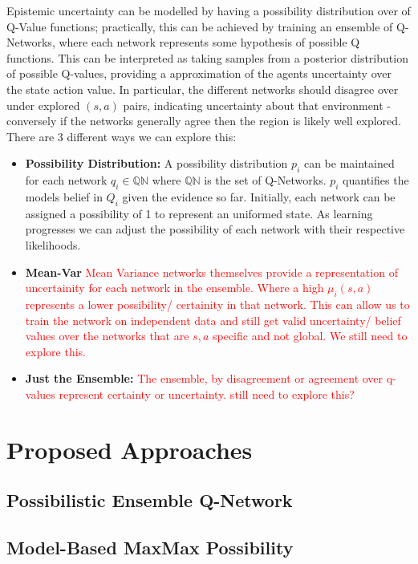 \documentclass[12pt,a4paper]{report}
\newcommand\myworries[1]{\textcolor{red}{#1}}
\begin{document}
Epistemic uncertainty can be modelled by having a possibility distribution over of Q-Value functions; practically, this can be achieved by training an ensemble of Q-Networks, where each network represents some hypothesis of possible Q functions. This can be interpreted as taking samples from a posterior distribution of possible Q-values, providing a approximation of the agents uncertainty over the state action value. In particular, the different networks should disagree over under explored $(s,a)$ pairs, indicating uncertainty about that environment - conversely if the networks generally agree then the region is likely well explored. There are 3 different ways we can explore this:
\begin{itemize}
  \item \textbf{Possibility Distribution:} A possibility distribution $p_i$ can be maintained for each network $q_i \in \mathbb{QN}$ where $\mathbb{QN}$  is the set of Q-Networks. $p_i$ quantifies the models belief in $Q_i$ given the evidence so far. Initially, each network can be assigned a possibility of 1 to represent an uniformed state. As learning progresses we can adjust the possibility of each network with their respective likelihoods.  
  \item \textbf{Mean-Var} \myworries{Mean Variance networks themselves provide a representation of uncertainity for each network in the ensemble. Where a high $\mu_i(s,a)$ represents a lower possibility/ certainity in that network. This can allow us to train the network on independent data and still get valid uncertainty/ belief values over the networks that are $s,a$ specific and not global. We still need to explore this.} 
  \item \textbf{Just the Ensemble:} \myworries{The ensemble, by disagreement or agreement over q-values represent certainty or uncertainty. still need to explore this?}
\end{itemize}

\chapter{Proposed Approaches}




\section{Possibilistic Ensemble Q-Network}
\section{Model-Based MaxMax Possibility}
\end{document}
